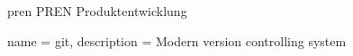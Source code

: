 \newacronym
  {pren}
  {PREN}
  {Produktentwicklung}

{
  name = git,
  description = {
    Modern version controlling system
  }
}